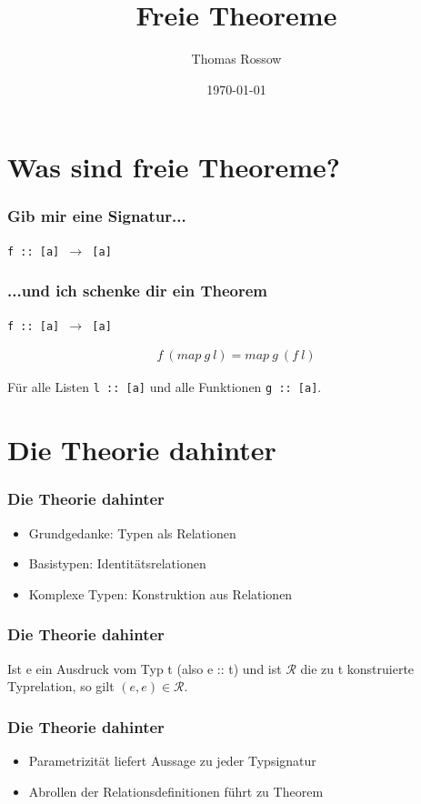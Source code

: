 \documentclass{beamer}
\title{Freie Theoreme}
\author{Thomas Rossow}
\date{\today}
\begin{document}
\maketitle
\frame{\tableofcontents}

\section{Was sind freie Theoreme?}

\begin{frame}
\frametitle{Gib mir eine Signatur...}
\texttt{f :: [a] $\rightarrow$ [a]}
\end{frame}

\begin{frame}
\frametitle{...und ich schenke dir ein Theorem}
\texttt{f :: [a] $\rightarrow$ [a]}

\begin{align*}
f\ (map\ g\ l) = map\ g\ (f\ l)
\end{align*}

Für alle Listen \texttt{l :: [a]} und alle Funktionen \texttt{g :: [a]}.

\end{frame}

\section{Die Theorie dahinter}
\begin{frame}
\frametitle{Die Theorie dahinter}

\begin{itemize}
\item Grundgedanke: Typen als Relationen
\item Basistypen: Identitätsrelationen
\item Komplexe Typen: Konstruktion aus Relationen
\end{itemize}

\end{frame}

\begin{frame}
\frametitle{Die Theorie dahinter}

\begin{Theorem}[Parametrizität]
Ist e ein Ausdruck vom Typ t (also e :: t) und ist $\mathcal{R}$ die zu t konstruierte Typrelation, so gilt
$(e, e) \in \mathcal{R}$.
\end{Theorem}

\end{frame}

\begin{frame}
\frametitle{Die Theorie dahinter}

\begin{itemize}
\item Parametrizität liefert Aussage zu jeder Typsignatur
\item Abrollen der Relationsdefinitionen führt zu Theorem
\end{itemize}

\end{frame}
\end{document}
